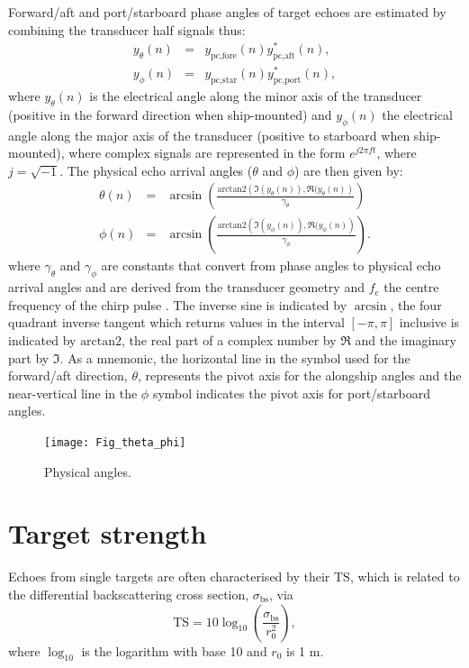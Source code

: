 \documentclass[preprint,12pt,TurnOnLineNumbers]{JASAnew}
\newcommand{\timesym}{t}
\newcommand{\freqsym}{f}
\newcommand{\samplesymt}{n}
\newcommand{\fc}{f_{\textrm{c}}}
\newcommand{\bs}{\sigma_{\textrm{bs}}}
\newcommand{\ts}{\textrm{TS}}
\newcommand{\rangeref}{r_0}
\newcommand{\athw}{\phi}
\newcommand{\along}{\theta}
\newcommand{\atan}{\textrm{arctan2}}
\newcommand{\anglefalong}{\gamma_\along}
\newcommand{\anglefathw}{\gamma_\athw}
\begin{document}
Forward/aft and port/starboard phase angles of target echoes are estimated by combining the transducer half signals thus: 
%
\begin{eqnarray}
\label{eq:phase1}
y_\along(\samplesymt) & = & y_{\textrm{pc,fore}}(\samplesymt) y_{\textrm{pc,aft}}^*(\samplesymt), \\
y_\athw(\samplesymt) & = & y_{\textrm{pc,star}}(\samplesymt) y_{\textrm{pc,port}}^*(\samplesymt),
\end{eqnarray}
%
where $y_\along(\samplesymt)$ is the electrical angle along the minor axis of the transducer (positive in the forward direction when ship-mounted) and $y_\athw(\samplesymt)$ the electrical angle along the major axis of the transducer (positive to starboard when ship-mounted), where complex signals are represented in the form $e^{j 2\pi \freqsym \timesym}$, where $j = \sqrt{-1}$. The physical echo arrival angles ($\along$ and $\athw$) are then given by:
%
\begin{eqnarray}
\label{eq:phase2}
\along(\samplesymt) & = & \arcsin\left( \frac{\atan\left( \Im(y_\along(\samplesymt)), \Re(y_\along(\samplesymt) \right)}{\anglefalong}\right) \\
\athw(\samplesymt) & = & \arcsin\left( \frac{\atan\left( \Im(y_\athw(\samplesymt)), \Re(y_\athw(\samplesymt) \right)}{\anglefathw}\right).
\end{eqnarray}
%
where $\anglefalong$ and $\anglefathw$ are constants that convert from phase angles to physical echo arrival angles and are derived from the transducer geometry and $\fc$ the centre frequency of the chirp pulse \citep{ehrenberg1979}. The inverse sine is indicated by $\arcsin$, the four quadrant inverse tangent which returns values in the interval $[-\pi, \pi]$ inclusive is indicated by $\atan$, the real part of a complex number by $\Re$ and the imaginary part by $\Im$. As a mnemonic, the horizontal line in the symbol used for the forward/aft direction, $\along$, represents the pivot axis for the alongship angles and the near-vertical line in the $\athw$ symbol indicates the pivot axis for port/starboard angles.
%
\begin{figure}
\texttt{[image: Fig\_theta\_phi]}
\caption{\label{fi:theta_phi}Physical angles.}
\end{figure}

\section{Target strength}

Echoes from single targets are often characterised by their $\ts$, which is related to the differential backscattering cross section, $\bs$, via
%
\begin{equation}
\label{eq:TS_bs}
\ts = 10\log_{10}\left(\frac{\bs}{\rangeref^2}\right),
\end{equation}
%
where $\log_{10}$ is the logarithm with base 10 and $\rangeref$ is 1 m.
\end{document}
